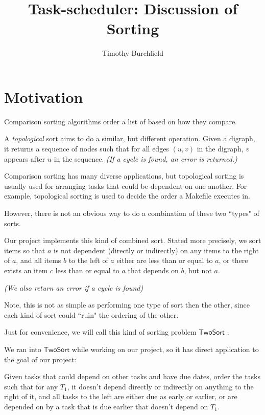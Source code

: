 \documentclass{article}
\title{Task-scheduler: Discussion of Sorting}
\author{Timothy Burchfield}
\newcommand{\sort}{$\mathsf{TwoSort}$ }
\begin{document}
\maketitle

\section*{Motivation}


Comparison sorting algorithms order a list of based on how they compare.

A \textit{topological} sort aims to do a similar, but different operation.  Given a digraph, it returns a sequence of nodes such that for all edges $(u, v)$ in the digraph, $v$ appears after $u$ in the sequence.
\textit{(If a cycle is found, an error is returned.)}

Comparison sorting has many diverse applications, but topological sorting is usually used for arranging tasks that could be dependent on one another.  For example, topological sorting is used to decide the order a Makefile executes in.

However, there is not an obvious way to do a combination of these two ``types" of sorts.

Our project implements this kind of combined sort.  Stated more precisely, we sort items so that $a$ is not dependent (directly or indirectly) on any items to the right of $a$, and all items $b$ to the left of $a$ either are less than or equal to $a$, or there exists an item $c$ less than or equal to $a$ that depends on $b$, but not $a$.

\textit{(We also return an error if a cycle is found)}

Note, this is not as simple as performing one type of sort then the other, since each kind of sort could ``ruin" the ordering of the other.

Just for convenience, we will call this kind of sorting problem \sort.

\bigskip

We ran into \sort while working on our project, so it has direct application to the goal of our project:

\bigskip

Given tasks that could depend on other tasks and have due dates,
order the tasks such that for any $T_1$, it doesn't depend directly or indirectly on anything to the right of it, and all tasks to the left are either due as early or earlier, or are depended on by a task that is due earlier that doesn't depend on $T_1$.
\end{document}
